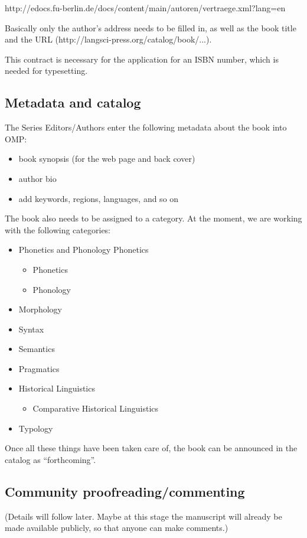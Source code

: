 \documentclass[ number=??
                ,series=lnls,
                ,isbn=000-0-000000-00-0,
                ,url=http://langsci-press.org/catalog/book/0,
	        ,output=long    %
	        ,draftmode  
		  ]{LSP/langsci}
\begin{document}
http://edocs.fu-berlin.de/docs/content/main/autoren/vertraege.xml?lang=en

Basically only the author's address needs to be filled in, as well as the book title and the URL (http://langsci-press.org/catalog/book/...).

This contract is necessary for the application for an ISBN number, which is needed for typesetting.

\subsection{Metadata and catalog}

The Series Editors/Authors enter the following metadata about the book into OMP:
\begin{itemize}
\item book synopsis (for the web page and back cover)
\item author bio
\item add keywords, regions, languages, and so on
\end{itemize}
The book also needs to be assigned to a category. At the moment, we are working with the following
categories:
\begin{itemize}
\item Phonetics and Phonology Phonetics
\begin{itemize}
\item Phonetics
\item Phonology
\end{itemize}
\item Morphology
\item Syntax
\item Semantics
\item Pragmatics
\item Historical Linguistics
\begin{itemize}
\item Comparative Historical Linguistics 
\end{itemize}
\item Typology
\end{itemize}
Once all these things have been taken care of, the book can be announced in the catalog as ``forthcoming''.

\subsection{Community proofreading/commenting}

(Details will follow later. Maybe at this stage the manuscript will already be made available publicly, so that anyone can make comments.)
\end{document}
